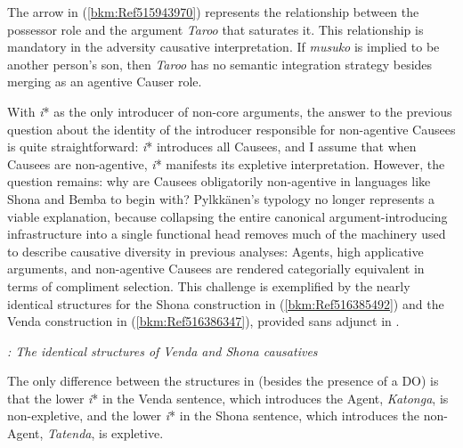 \documentclass[output=paper,modfonts,nonflat]{langsci/langscibook}
\begin{document}
\begin{styleDefault}
The arrow in (\ref{bkm:Ref515943970}) represents the relationship between the possessor role and the argument \textit{Taroo} that saturates it. This relationship is mandatory in the adversity causative interpretation. If \textit{musuko} is implied to be another person’s son, then \textit{Taroo} has no semantic integration strategy besides merging as an agentive Causer role. 
\end{styleDefault}

\begin{styleDefault}
With \textit{i}* as the only introducer of non-core arguments, the answer to the previous question about the identity of the introducer responsible for non-agentive Causees is quite straightforward: \textit{i}* introduces all Causees, and I assume that when Causees are non-agentive, \textit{i}* manifests its expletive interpretation. However, the question remains: why are Causees obligatorily non-agentive in languages like Shona and Bemba to begin with? Pylkkänen’s typology no longer represents a viable explanation, because collapsing the entire canonical argument-introducing infrastructure into a single functional head removes much of the machinery used to describe causative diversity in previous analyses: Agents, high applicative arguments, and non-agentive Causees are rendered categorially equivalent in terms of compliment selection. This challenge is exemplified by the nearly identical structures for the Shona construction in (\ref{bkm:Ref516385492}) and the Venda construction in (\ref{bkm:Ref516386347}), provided sans adjunct in . 
\end{styleDefault}

\begin{styleDefault}
  
   
 
\end{styleDefault}

\begin{styleDefault}
\textit{: The identical structures of Venda and Shona causatives} 
\end{styleDefault}

\begin{styleDefault}
The only difference between the structures in  (besides the presence of a DO) is that the lower \textit{i}* in the Venda sentence, which introduces the Agent, \textit{Katonga}, is non-expletive, and the lower \textit{i}* in the Shona sentence, which introduces the non-Agent, \textit{Tatenda}, is expletive. 
\end{styleDefault}
\end{document}
